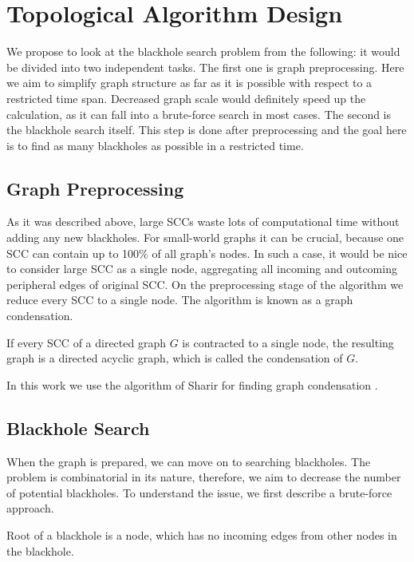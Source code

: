 \documentclass{svproc}
\begin{document}
\section{Topological Algorithm Design}
We propose to look at the blackhole search problem from the following: it would be divided into two independent tasks. 
The first one is graph preprocessing. Here we aim to simplify graph structure as far as it is possible with respect to a restricted time span. 
Decreased graph scale would definitely speed up the calculation, as it can fall into a brute-force search in most cases.
The second is the blackhole search itself. This step is done after preprocessing and the goal here is to find as many blackholes as possible in a restricted time.

%
\subsection{Graph Preprocessing}
As it was described above, large SCCs waste lots of computational time without adding any new blackholes. 
For small-world graphs it can be crucial, because one SCC can contain up to 100\% of all graph's nodes. 
In such a case, it would be nice to consider large SCC as a single node, aggregating all incoming and outcoming peripheral edges
of original SCC.
On the preprocessing stage of the algorithm we reduce every SCC to a single node. The algorithm is known as a graph condensation.

\begin{definition}
If every SCC of a directed graph $G$ is contracted to a single node, the resulting graph is a directed acyclic graph, which is called the condensation of $G$.
\end{definition}

In this work we use the algorithm of Sharir for finding graph condensation \cite{sharir1981strong}. 

\subsection{Blackhole Search}
When the graph is prepared, we can move on to searching blackholes. The problem is combinatorial in its nature, therefore, we aim to
decrease the number of potential blackholes.
To understand the issue, we first describe a brute-force approach. 

\begin{definition}
Root of a blackhole is a node, which has no incoming edges from other nodes in the blackhole.
\end{definition}
\end{document}
